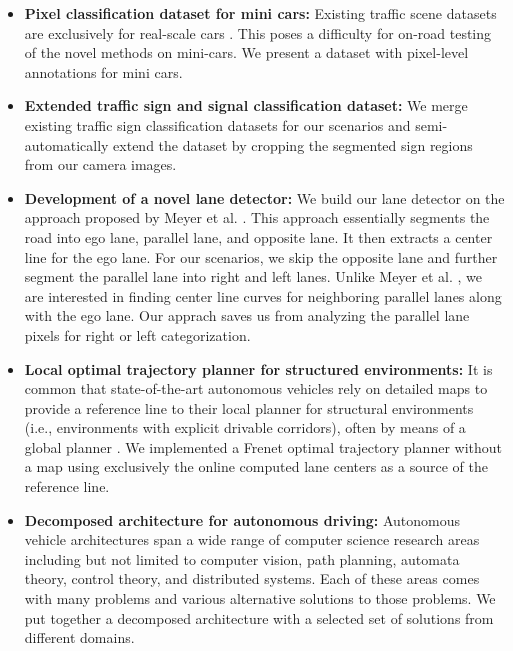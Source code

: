 \begin{itemize}
  \item \textbf{Pixel classification dataset for mini cars:} Existing traffic
    scene datasets are exclusively for real-scale cars \cite{Huang2018TheAD,
    Cordts2016TheCD, Geiger2012AreWR, Neuhold2017TheMV}. This poses a
    difficulty for on-road testing of the novel methods on mini-cars. We
    present a dataset with pixel-level annotations for mini cars.
  \item \textbf{Extended traffic sign and signal classification dataset:} We
    merge existing traffic sign classification datasets
    \cite{Timofte2009MultiviewTS, Stallkamp2012ManVC, Shakhuro2016RussianTS,
    Serna2018ClassificationOT, MaldonadoBascn2007RoadSignDA} for our scenarios
    and semi-automatically extend the dataset by cropping the segmented sign
    regions from our camera images.
  \item \textbf{Development of a novel lane detector:} We build our lane
    detector on the approach proposed by Meyer et al. \cite{Meyer2018DeepSL}.
    This approach essentially segments the road into ego lane, parallel lane,
    and opposite lane. It then extracts a center line for the ego lane. For our
    scenarios, we skip the opposite lane and further segment the parallel lane
    into right and left lanes. Unlike Meyer et al. \cite{Meyer2018DeepSL}, we
    are interested in finding center line curves for neighboring parallel lanes
    along with the ego lane. Our apprach saves us from analyzing the parallel
    lane pixels for right or left categorization.
  \item \textbf{Local optimal trajectory planner for structured environments:}
    It is common that state-of-the-art autonomous vehicles rely on detailed
    maps to provide a reference line to their local planner for structural
    environments (i.e., environments with explicit drivable corridors), often
    by means of a global planner \cite{Thrun2006StanleyTR,
    Montemerlo2009JuniorTS, Kato2018AutowareOB}. We implemented a Frenet
    optimal trajectory planner \cite{Werling2010OptimalTG} without a map using
    exclusively the online computed lane centers as a source of the reference
    line.
  \item \textbf{Decomposed architecture for autonomous driving:} Autonomous
    vehicle architectures span a wide range of computer science research areas
    including but not limited to computer vision, path planning, automata
    theory, control theory, and distributed systems. Each of these areas comes
    with many problems and various alternative solutions to those problems. We
    put together a decomposed architecture with a selected set of solutions
    from different domains.
\end{itemize}

